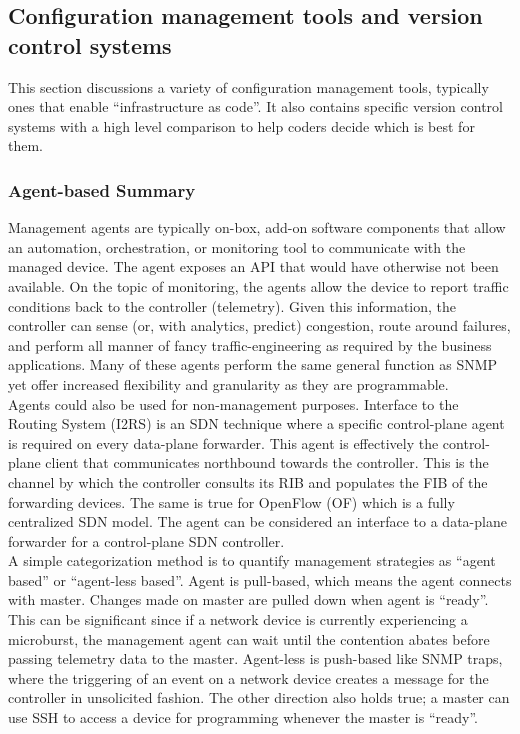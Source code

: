 \subsection{Configuration management tools and version control systems}
This section discussions a variety of configuration management tools, typically
ones that enable ``infrastructure as code''. It also contains specific
version control systems with a high level comparison to help coders decide
which is best for them.

\subsubsection{Agent-based Summary}
Management agents are typically on-box, add-on software components that allow
an automation, orchestration, or monitoring tool to communicate with the
managed device. The agent exposes an API that would have otherwise not been
available. On the topic of monitoring, the agents allow the device to report
traffic conditions back to the controller (telemetry). Given this information,
the controller can sense (or, with analytics, predict) congestion, route
around failures, and perform all manner of fancy traffic-engineering as
required by the business applications. Many of these agents perform the same
general function as SNMP yet offer increased flexibility and granularity as
they are programmable. \\

Agents could also be used for non-management purposes. Interface to the
Routing System (I2RS) is an SDN technique where a specific control-plane agent
is required on every data-plane forwarder. This agent is effectively the
control-plane client that communicates northbound towards the controller. This
is the channel by which the controller consults its RIB and populates the FIB
of the forwarding devices. The same is true for OpenFlow (OF) which is a fully
centralized SDN model. The agent can be considered an interface to a
data-plane forwarder for a control-plane SDN controller. \\

A simple categorization method is to quantify management strategies as ``agent
based'' or ``agent-less based''. Agent is pull-based, which means the agent
connects with master. Changes made on master are pulled down when agent is
``ready''. This can be significant since if a network device is currently
experiencing a microburst, the management agent can wait until the contention
abates before passing telemetry data to the master. Agent-less is push-based
like SNMP traps, where the triggering of an event on a network device creates
a message for the controller in unsolicited fashion. The other direction also
holds true; a master can use SSH to access a device for programming whenever
the master is ``ready''. \\

